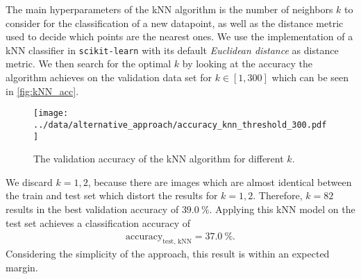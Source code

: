 The main hyperparameters of the kNN algorithm is the number of neighbors $k$ to consider for the classification of a new datapoint, as well as the distance metric used to decide which points are 
the nearest ones.
We use the implementation of a kNN classifier in \texttt{scikit-learn} \cite{scikit-learn} with its default \textit{Euclidean distance} as distance metric.
We then search for the optimal $k$ by looking at the accuracy the algorithm achieves on the validation data set for $k \in [1, 300]$ which can be seen in \autoref{fig:kNN_acc}.
\begin{wrapfigure}{r}{0.55\textwidth}
    \centering
    \texttt{[image: ../data/alternative\_approach/accuracy\_knn\_threshold\_300.pdf]}
    \caption{The validation accuracy of the kNN algorithm for different $k$.}
    \label{fig:kNN_acc}
\end{wrapfigure}
We discard $k = 1, 2$, because there are images which are almost identical between the train and test set which distort the results for $k = 1, 2$.
Therefore, $k = 82$ results in the best validation accuracy of $\SI{39.0}{\percent}$.
Applying this kNN model on the test set achieves a classification accuracy of 
\begin{align}
    \text{accuracy}_\text{test, kNN} = \SI{37.0}{\percent}.
\end{align}
Considering the simplicity of the approach, this result is within an expected margin.
